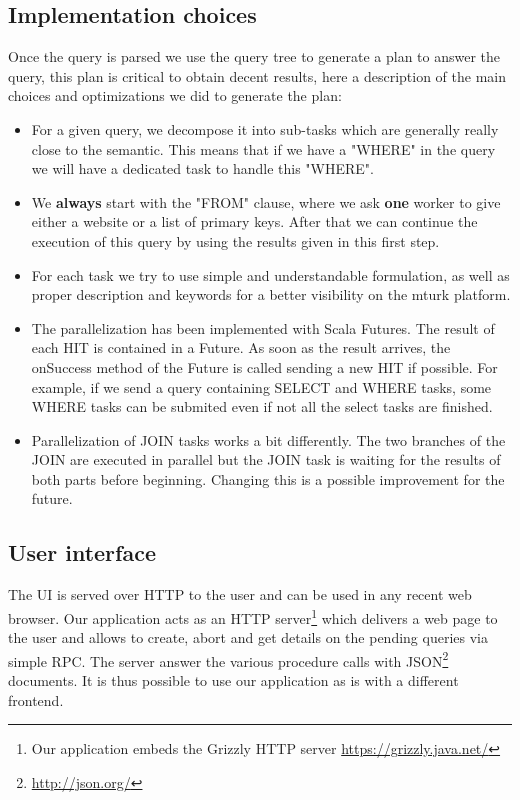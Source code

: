 \documentclass{article}
\begin{document}
\subsection{Implementation choices}
Once the query is parsed we use the query tree to generate a plan to answer the query, this plan is critical to obtain decent results, here a description of the main choices and optimizations we did to generate the plan:
\begin{itemize}
\item For a given query, we decompose it into sub-tasks which are generally really close to the semantic. This means that if we have a "WHERE" in the query we will have a dedicated task to handle this "WHERE".
\item We \textbf{always} start with the "FROM" clause, where we ask \textbf{one} worker to give either a website or a list of primary keys. After that we can continue the execution of this query by using the results given in this first step.
\item For each task we try to use simple and understandable formulation, as well as proper description and keywords for a better visibility on the mturk platform. 
\item The parallelization has been implemented with Scala Futures. The result of each HIT is contained in a Future. As soon as the result arrives, the onSuccess method of the Future is called sending a new HIT if possible. For example, if we send a query containing SELECT and WHERE tasks, some WHERE tasks can be submited even if not all the select tasks are finished.
\item Parallelization of JOIN tasks works a bit differently. The two branches of the JOIN are executed in parallel but the JOIN task is waiting for the results of both parts before beginning. Changing this is a possible improvement for the future.
\end{itemize}
\newpage
\subsection{User interface}

The UI is served over HTTP to the user and can be used in any recent web
browser. Our application acts as an HTTP server\footnote{Our application embeds
the Grizzly HTTP server \url{https://grizzly.java.net/}} which delivers a web page to the
user and allows to create, abort and get details on the pending
queries via simple RPC. The server answer the various procedure calls with
JSON\footnote{\url{http://json.org/}} documents. It is thus possible to use our
application as is with a different frontend.
\end{document}
